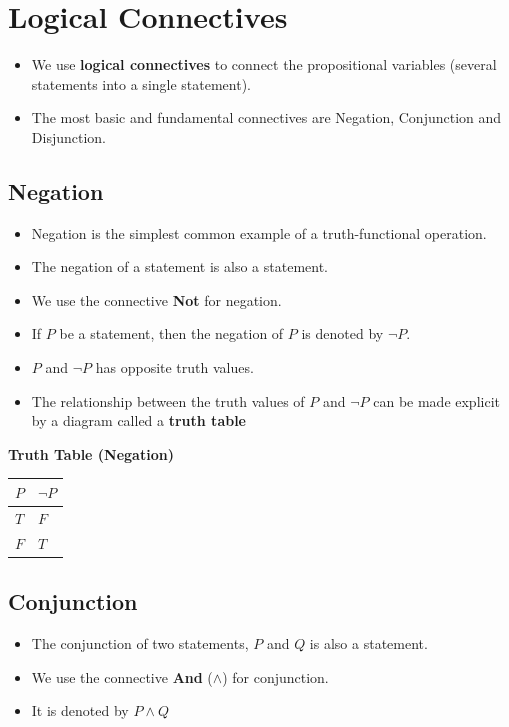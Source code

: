 \documentclass[]{book}
\providecommand{\tightlist}{%
  \setlength{\itemsep}{0pt}\setlength{\parskip}{0pt}}
\begin{document}
\hypertarget{logical-connectives}{%
\section{Logical Connectives}\label{logical-connectives}}

\begin{itemize}
\tightlist
\item
  We use \textbf{logical connectives} to connect the propositional variables (several statements into a single statement).
\item
  The most basic and fundamental connectives are Negation, Conjunction and Disjunction.
\end{itemize}

\hypertarget{negation}{%
\subsection{Negation}\label{negation}}

\begin{itemize}
\tightlist
\item
  Negation is the simplest common example of a truth-functional operation.
\item
  The negation of a statement is also a statement.
\item
  We use the connective \textbf{Not} for negation.
\item
  If \(P\) be a statement, then the negation of \(P\) is denoted by \(\neg P\).
\item
  \(P\) and \(\neg P\) has opposite truth values.
\item
  The relationship between the truth values of \(P\) and \(\neg P\) can be made explicit by a diagram called a \textbf{truth table}
\end{itemize}

\textbf{Truth Table (Negation)}

\begin{longtable}[]{@{}ll@{}}
\toprule
\(P\) & \(\neg P\)\tabularnewline
\midrule
\endhead
\(T\) & \(F\)\tabularnewline
\(F\) & \(T\)\tabularnewline
\bottomrule
\end{longtable}

\hypertarget{conjunction}{%
\subsection{Conjunction}\label{conjunction}}

\begin{itemize}
\tightlist
\item
  The conjunction of two statements, \(P\) and \(Q\) is also a statement.
\item
  We use the connective \textbf{And} (\(\land\)) for conjunction.
\item
  It is denoted by \(P \land Q\)
\end{itemize}
\end{document}
